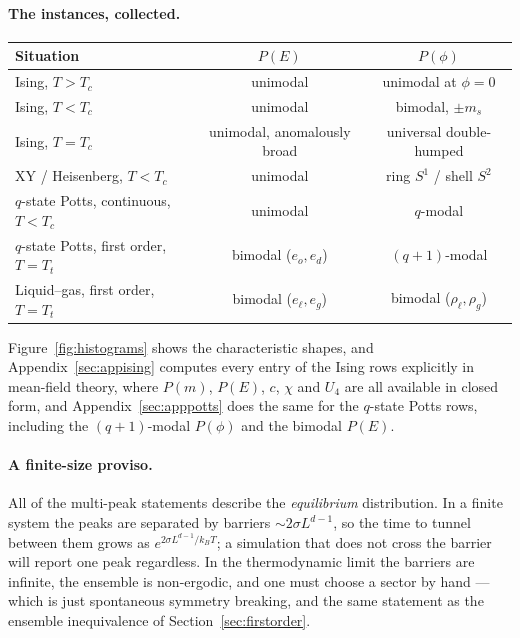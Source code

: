 \documentclass[10pt,a4paper]{article}
\theoremstyle{remark}
\begin{document}
\paragraph{The instances, collected.}
\begin{center}
\small
\renewcommand{\arraystretch}{1.15}
\begin{tabular}{lcc}
\toprule
Situation & $P(E)$ & $P(\phi)$ \\
\midrule
Ising, $T>T_c$ & unimodal & unimodal at $\phi=0$ \\
Ising, $T<T_c$ & unimodal & bimodal, $\pm m_s$ \\
Ising, $T=T_c$ & unimodal, anomalously broad & universal double-humped \\
XY / Heisenberg, $T<T_c$ & unimodal & ring $S^{1}$ / shell $S^{2}$ \\
$q$-state Potts, continuous, $T<T_c$ & unimodal & $q$-modal \\
$q$-state Potts, first order, $T=T_t$ & bimodal ($e_o,e_d$) & $(q{+}1)$-modal \\
Liquid--gas, first order, $T=T_t$ & bimodal ($e_\ell,e_g$) & bimodal ($\rho_\ell,\rho_g$) \\
\bottomrule
\end{tabular}
\end{center}
Figure~\ref{fig:histograms} shows the characteristic shapes, and
Appendix~\ref{sec:appising} computes every entry of the Ising rows explicitly in
mean-field theory, where $P(m)$, $P(E)$, $c$, $\chi$ and $U_4$ are all available
in closed form, and Appendix~\ref{sec:apppotts} does the same for the $q$-state
Potts rows, including the $(q{+}1)$-modal $P(\phi)$ and the bimodal $P(E)$.

\paragraph{A finite-size proviso.} All of the multi-peak statements describe the
\emph{equilibrium} distribution. In a finite system the peaks are separated by
barriers $\sim2\sigma L^{d-1}$, so the time to tunnel between them grows as
$e^{2\sigma L^{d-1}/k_BT}$; a simulation that does not cross the barrier will
report one peak regardless. In the thermodynamic limit the barriers are infinite,
the ensemble is non-ergodic, and one must choose a sector by hand --- which is
just spontaneous symmetry breaking, and the same statement as the ensemble
inequivalence of Section~\ref{sec:firstorder}.
\end{document}
